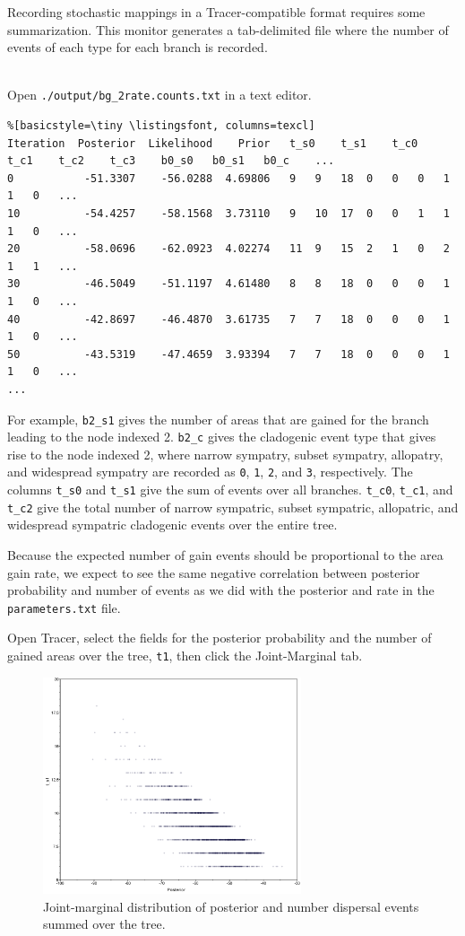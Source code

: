 Recording stochastic mappings in a Tracer-compatible format requires some summarization.
This monitor generates a tab-delimited file where the number of events of each type for each branch is recorded.

\noindent \\ \impmark Open {\tt ./output/bg\_2rate.counts.txt} in a text editor.

\begin{framed}
\begin{lstlisting}%[basicstyle=\tiny \listingsfont, columns=texcl]
Iteration  Posterior  Likelihood    Prior	t_s0	t_s1	t_c0	t_c1	t_c2	t_c3	b0_s0	b0_s1	b0_c	...
0           -51.3307    -56.0288  4.69806	9	9	18	0	0	0	1	1	0	...	
10          -54.4257    -58.1568  3.73110	9	10	17	0	0	1	1	1	0	...
20          -58.0696    -62.0923  4.02274	11	9	15	2	1	0	2	1	1	...
30          -46.5049    -51.1197  4.61480	8	8	18	0	0	0	1	1	0	...
40          -42.8697    -46.4870  3.61735	7	7	18	0	0	0	1	1	0	...
50          -43.5319    -47.4659  3.93394	7	7	18	0	0	0	1	1	0	...
...
\end{lstlisting}
\end{framed}

For example, {\tt b2\_s1} gives the number of areas that are gained for the branch leading to the node indexed 2.
{\tt b2\_c} gives the cladogenic event type that gives rise to the node indexed 2, where narrow sympatry, subset sympatry, allopatry, and widespread sympatry are recorded as {\tt 0}, {\tt 1}, {\tt 2}, and {\tt 3}, respectively. The columns {\tt t\_s0} and {\tt t\_s1} give the sum of events over all branches. {\tt t\_c0}, {\tt t\_c1}, and {\tt t\_c2} give the total number of narrow sympatric, subset sympatric, allopatric, and widespread sympatric cladogenic events over the entire tree.

Because the expected number of gain events should be proportional to the area gain rate, we expect to see the same negative correlation between posterior probability and number of events as we did with the posterior and rate in the {\tt parameters.txt} file.

Open Tracer, select the fields for the posterior probability and the number of gained areas over the tree, {\tt t1}, then click the Joint-Marginal tab.

\begin{figure}[H]
\centering
\includegraphics[width=3in]{figures/joint_ngain_posterior}
\caption{Joint-marginal distribution of posterior and number dispersal events summed over the tree.}
\end{figure}

